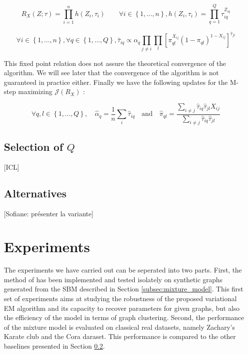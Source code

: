 \documentclass[10pt]{article}
\begin{document}
\begin{equation}
    \label{eq:approximated_distribution}
    R_X(Z; \tau)=\prod_{i=1}^n h(Z_i, \tau_i) \quad\quad \forall i \in \left\{1,\dots,n\right\}, h(Z_i, \tau_i)=\prod_{q=1}^Q \tau_{iq}^{Z_{iq}}
\end{equation}

\begin{equation}
    \label{eq:fixed_point}
    \forall i \in \left\{1,\dots,n\right\}, \forall q \in \left\{1,\dots,Q\right\}, \hat{\tau}_{iq}\propto \alpha_q \prod_{j\neq i}\prod_l \left[\pi_{ql}^{X_{ij}}(1-\pi_{ql})^{1-X_{ij}}\right]^{\hat{\tau}_{jl}}
\end{equation}

This fixed point relation does not assure the theoretical convergence of the algorithm. We will see later that the convergence of the algorithm is not guaranteed in practice either. Finally we have the following updates for the M-step maximizing $\mathcal{J}(R_X)$ :

\begin{equation}
    \label{eq:m_step}
    \forall q, l \in \left\{1,\dots,Q\right\}, \quad
    \hat{\alpha}_q=\frac{1}{n}\sum_{i} \hat{\tau}_{iq}
    \quad
    \text{and} 
    \quad
    \hat{\pi}_{ql}=\frac{\sum_{i\neq j} \hat{\tau}_{iq}\hat{\tau}_{jl}X_{ij}}{\sum_{i\neq j} \hat{\tau}_{iq}\hat{\tau}_{jl}}
\end{equation}

\subsection{Selection of $Q$}

[ICL]

\subsection{Alternatives}
    \label{subsec:alternatives}

[Sofiane: présenter la variante]


\section{Experiments}
\label{sec:experiments}

The experiments we have carried out can be seperated into two parts. First, the method of \cite{main_article} has been implemented and tested isolately on synthetic graphs generated from the SBM described in Section \ref{subsec:mixture_model}. This first set of experiments aims at studying the robustness of the proposed variational EM algorithm and its capacity to recover parameters for given graphs, but also the efficiency of the model in terms of graph clustering.
Second, the performance of the mixture model is evaluated on classical real datasets, namely Zachary's Karate club and the Cora daraset. This performance is compared to the other baselines presented in Section \ref{subsec:alternatives}.
\end{document}
